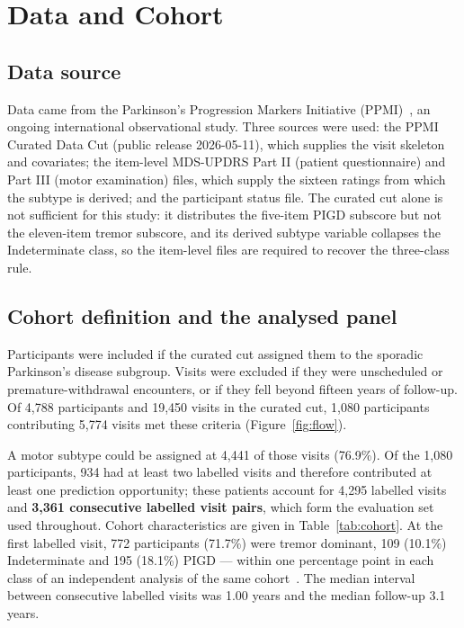\documentclass[11pt]{article}
\begin{document}
\section{Data and Cohort}
\label{sec:data}

\subsection{Data source}
Data came from the Parkinson's Progression Markers Initiative
(PPMI)~\citep{marek2011ppmi}, an ongoing international observational study.
Three sources were used: the PPMI Curated Data Cut (public release 2026-05-11),
which supplies the visit skeleton and covariates; the item-level MDS-UPDRS Part
II (patient questionnaire) and Part III (motor examination) files, which supply
the sixteen ratings from which the subtype is derived; and the participant status
file. The curated cut alone is not sufficient for this study: it distributes the
five-item PIGD subscore but not the eleven-item tremor subscore, and its derived
subtype variable collapses the Indeterminate class, so the item-level files are
required to recover the three-class rule.

\subsection{Cohort definition and the analysed panel}
Participants were included if the curated cut assigned them to the sporadic
Parkinson's disease subgroup. Visits were excluded if they were unscheduled or
premature-withdrawal encounters, or if they fell beyond fifteen years of
follow-up. Of 4,788 participants and 19,450 visits in the curated cut, 1,080
participants contributing 5,774 visits met these criteria
(Figure~\ref{fig:flow}).

A motor subtype could be assigned at 4,441 of those visits (76.9\%). Of the
1,080 participants, 934 had at least two labelled visits and therefore
contributed at least one prediction opportunity; these patients account for
4,295 labelled visits and \textbf{3,361 consecutive labelled visit pairs}, which
form the evaluation set used throughout. Cohort characteristics are given in
Table~\ref{tab:cohort}. At the first labelled visit, 772 participants (71.7\%)
were tremor dominant, 109 (10.1\%) Indeterminate and 195 (18.1\%) PIGD --- within
one percentage point in each class of an independent analysis of the same
cohort~\citep{simuni2016}. The median interval between consecutive labelled
visits was 1.00 years and the median follow-up 3.1 years.
\end{document}
